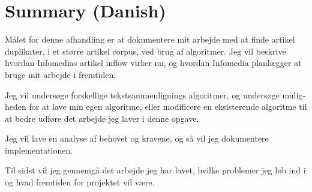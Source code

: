 \chapter{Summary (Danish)}
\begin{otherlanguage}{danish}

Målet for denne afhandling er at dokumentere mit arbejde med at finde artikel duplikater, i et større artikel corpus, ved brug af algoritmer. Jeg vil beskrive hvordan Infomedias artikel inflow virker nu, og hvordan Infomedia planlægger at bruge mit arbejde i fremtiden.

Jeg vil undersøge forskellige tekstsammenlignings algoritmer, og undersøge muligheden for at lave min egen algoritme, eller modificere en eksisterende algoritme til at bedre udføre det arbejde jeg laver i denne opgave.

Jeg vil lave en analyse af behovet og kravene, og så vil jeg dokumentere implementationen.

Til sidst vil jeg gennemgå det arbejde jeg har lavet, hvilke problemer jeg løb ind i og hvad fremtiden for projektet vil være.

\end{otherlanguage}